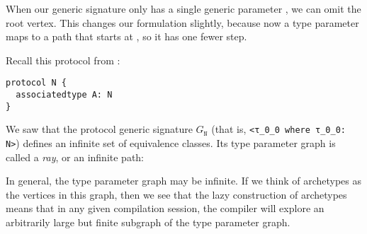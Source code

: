 \documentclass[../generics]{subfiles}
\begin{document}
When our generic signature only has a single generic parameter \rT, we can omit the root vertex. This changes our formulation slightly, because now a type parameter maps to a path that starts at \rT, so it has one fewer step.

\begin{example}\label{protocol n graph} Recall this protocol from :
\begin{Verbatim}
protocol N {
  associatedtype A: N
}
\end{Verbatim}
We saw that the protocol generic signature $G_\texttt{N}$ (that is, \verb|<τ_0_0 where τ_0_0: N>|) defines an infinite set of equivalence classes. Its type parameter graph is called a \emph{ray}, or an infinite path:
\begin{center}
\end{center}
\end{example}

In general, the type parameter graph may be infinite. If we think of archetypes as the vertices in this graph, then we see that the lazy construction of archetypes means that in any given compilation session, the compiler will explore an arbitrarily large but finite subgraph of the type parameter graph.
\end{document}
